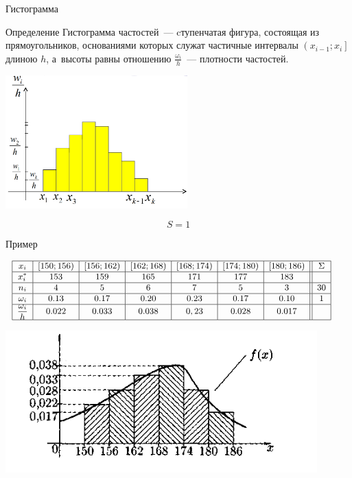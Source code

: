 \documentclass[unicode,11pt,notheorems,xcolor=table]{beamer}
\begin{document}
\begin{frame}{Гистограмма}{}
    \begin{block}{Определение}
        \alert{Гистограмма частостей}~--- cтупенчатая фигура, состоящая из прямоугольников, основаниями которых 
        служат частичные интервалы $\left(x_{i-1};x_i\right]$  длиною $h$, а~высоты равны отношению $\frac{\omega_i}{h}$~--- плотности частостей.
    \end{block}
    \begin{minipage}{8cm}
        \centering\includegraphics[width=7cm]{hist-1.png}
    \end{minipage}
    \begin{minipage}{2cm}
        {\LARGE
        $$
            S=1
        $$
        \par}
    \end{minipage}
\end{frame}

\begin{frame}{Пример}{}


    ~\hspace{-8mm}$
    \small
    \begin{array}{|c|c|c|c|c|c|c||c|}
        \hline
        x_i & \left[150; 156 \right) &  \left[156; 162\right) &  \left[ 162; 168 \right) &  \left[ 168; 174 \right) &  \left[174; 180 \right) &  \left[180; 186 \right) & \Sigma\\
        \hline
        x^*_i & 153 &  159 &  165 &  171 &  177 &  183 & \\        
        \hline
        n_i & 4 & 5 & 6 & 7 & 5 & 3 & 30\\
        \hline
        \omega_i & 0.13 & 0.17 & 0.20 & 0.23 & 0.17 & 0.10 & 1\\
        \hline
       \dfrac{\omega_i}{h} & 0.022 & 0.033 & 0.038 & 0,23 & 0.028 & 0.017 &\\
        \hline
    \end{array}
    $

    \bigskip 
    \centering\includegraphics[width=12cm]{hist-2.png}

\end{frame}
\end{document}
